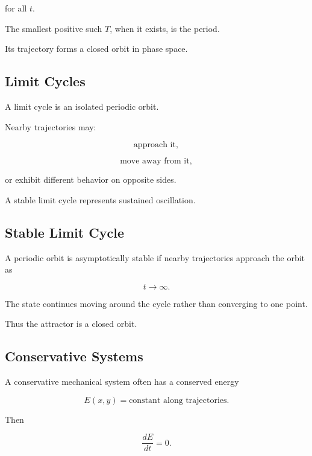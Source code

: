 for all \(t\).

The smallest positive such \(T\), when it exists, is the period.

Its trajectory forms a closed orbit in phase space.

\subsection{Limit Cycles}
\label{subsec:limit-cycles}

A limit cycle is an isolated periodic orbit.

Nearby trajectories may:

\[
\boxed{
\text{approach it},
}
\]

\[
\boxed{
\text{move away from it},
}
\]

or exhibit different behavior on opposite sides.

A stable limit cycle represents sustained oscillation.

\subsection{Stable Limit Cycle}
\label{subsec:stable-limit-cycle}

A periodic orbit is asymptotically stable if nearby trajectories approach
the orbit as

\[
t\to\infty.
\]

The state continues moving around the cycle rather than converging to one
point.

Thus the attractor is a closed orbit.

\subsection{Conservative Systems}
\label{subsec:conservative-systems}

A conservative mechanical system often has a conserved energy

\[
\boxed{
E(x,y)
=
\text{constant along trajectories}.
}
\]

Then

\[
\boxed{
\frac{dE}{dt}=0.
}
\]

